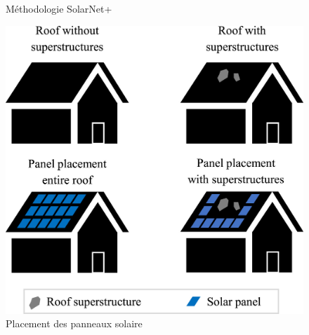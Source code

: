 \begin{figure}[H]
    \caption{Méthodologie SolarNet+ \cite{li_deep_2024}}
    \label{fig:solar_net_plus_methodo}
\end{figure}

\begin{figure}[H]
    \centering
    \includegraphics[width=0.5\linewidth]{02-main//figures/ch2/solar_net_plus_placement_pv.png}
    \caption{Placement des panneaux solaire \cite{li_deep_2024}}
    \label{fig:solar_net_plus_placement_pv}
\end{figure}

